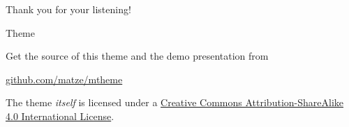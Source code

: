 \documentclass[aspectratio=169, dvipdfmx, 11pt]{beamer}
\begin{document}
\begin{frame}
  Thank you for your listening!
\end{frame}

\begin{frame}{Theme}

  Get the source of this theme and the demo presentation from

  \begin{center}\url{github.com/matze/mtheme}\end{center}

  The theme \emph{itself} is licensed under a
  \href{http://creativecommons.org/licenses/by-sa/4.0/}{Creative Commons
    Attribution-ShareAlike 4.0 International License}.

  \begin{center}\ccbysa\end{center}
\end{frame}
\end{document}
